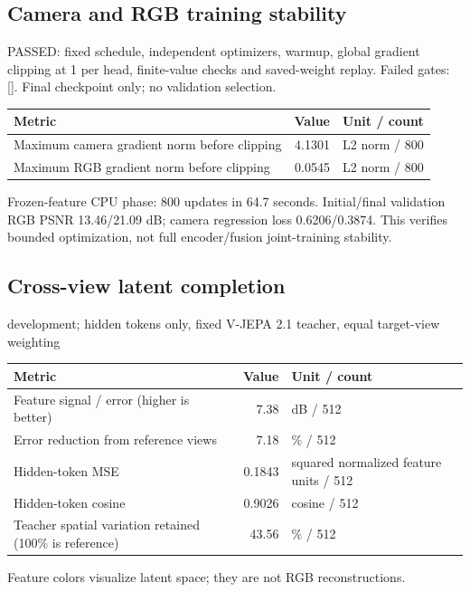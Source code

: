 \documentclass[10pt]{article}
\begin{document}
\subsection{Camera and RGB training stability}
PASSED: fixed schedule, independent optimizers, warmup, global gradient clipping at 1 per head, finite-value checks and saved-weight replay. Failed gates: []. Final checkpoint only; no validation selection.
\begin{center}\begin{tabular}{p{.57\linewidth}rp{.23\linewidth}}\toprule Metric & Value & Unit / count \\ \midrule
Maximum camera gradient norm before clipping & 4.1301 & L2 norm / 800 \\
Maximum RGB gradient norm before clipping & 0.0545 & L2 norm / 800 \\
\bottomrule\end{tabular}\end{center}
Frozen-feature CPU phase: 800 updates in 64.7 seconds. Initial/final validation RGB PSNR 13.46/21.09 dB; camera regression loss 0.6206/0.3874. This verifies bounded optimization, not full encoder/fusion joint-training stability.

\subsection{Cross-view latent completion}
development; hidden tokens only, fixed V-JEPA 2.1 teacher, equal target-view weighting
\begin{center}\begin{tabular}{p{.57\linewidth}rp{.23\linewidth}}\toprule Metric & Value & Unit / count \\ \midrule
Feature signal / error (higher is better) & 7.38 & dB / 512 \\
Error reduction from reference views & 7.18 & \% / 512 \\
Hidden-token MSE & 0.1843 & squared normalized feature units / 512 \\
Hidden-token cosine & 0.9026 & cosine / 512 \\
Teacher spatial variation retained (100\% is reference) & 43.56 & \% / 512 \\
\bottomrule\end{tabular}\end{center}
Feature colors visualize latent space; they are not RGB reconstructions.
\end{document}
